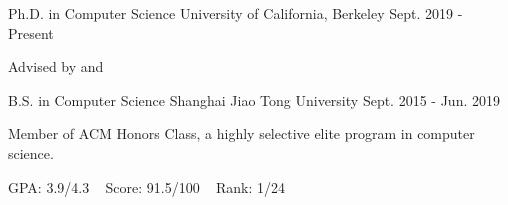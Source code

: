 
\begin{cventries}

  \cventry
	{Ph.D. in Computer Science} %
	{University of California, Berkeley} %
	{Sept. 2019 - Present} %
	{} %
	{
		\begin{cvitems} %
			\item {Advised by   and  }
		\end{cvitems}
	}

  \cventry
    {B.S. in Computer Science} %
    {Shanghai Jiao Tong University} %
    {Sept. 2015 - Jun. 2019} %
    {} %
    {
    \begin{cvitems} %
    	\item {Member of ACM Honors Class, a highly selective elite program in computer science.}
    	\item {GPA: 3.9/4.3 ~ Score: 91.5/100 ~ Rank: 1/24}
    \end{cvitems}
    }

\end{cventries}
